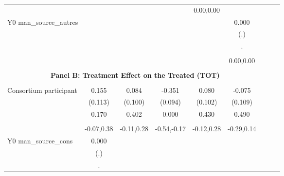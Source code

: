 \begin{table}[!h]
\begin{adjustbox}{width=\columnwidth,center}
\begin{tabular}{l*{8}{c}}
                    &                     &                     &                     &   0.00,0.00         &                     \\
Y0 man\_source\_autres&                     &                     &                     &                     &       0.000         \\
                    &                     &                     &                     &                     &         (.)         \\
                    &                     &                     &                     &                     &           .         \\
                    &                     &                     &                     &                     &                     \\
                    &                     &                     &                     &                     &   0.00,0.00         \\
\hline \\ \multicolumn{7}{c}{\textbf{Panel B: Treatment Effect on the Treated (TOT)}} \\\\[-1ex]
Consortium participant&       0.155         &       0.084         &      -0.351\sym{***}&       0.080         &      -0.075         \\
                    &     (0.113)         &     (0.100)         &     (0.094)         &     (0.102)         &     (0.109)         \\
                    &       0.170         &       0.402         &       0.000         &       0.430         &       0.490         \\
                    &                     &                     &                     &                     &                     \\
                    &  -0.07,0.38         &  -0.11,0.28         & -0.54,-0.17         &  -0.12,0.28         &  -0.29,0.14         \\
Y0 man\_source\_cons &       0.000         &                     &                     &                     &                     \\
                    &         (.)         &                     &                     &                     &                     \\
                    &           .         &                     &                     &                     &                     \\

\end{tabular}
\end{adjustbox}
\end{table}
